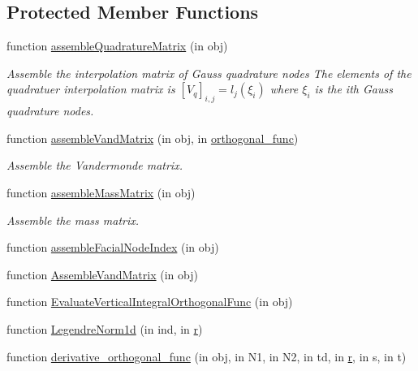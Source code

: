 \subsection*{Protected Member Functions}
\begin{DoxyCompactItemize}
\item 
function \hyperlink{class_std_prism_quad_a394370fb840f0276eeaf50183c2560e7}{assemble\+Quadrature\+Matrix} (in obj)
\begin{DoxyCompactList}\small\item\em Assemble the interpolation matrix of Gauss quadrature nodes The elements of the quadratuer interpolation matrix is $ [V_q]_{i,j} = l_j(\xi_i) $ where $ \xi_i $ is the ith Gauss quadrature nodes. \end{DoxyCompactList}\item 
function \hyperlink{class_std_prism_quad_a6414e5f23eaf75fbce9ad2fa9aad58e6}{assemble\+Vand\+Matrix} (in obj, in \hyperlink{class_std_prism_quad_aec55fc052d6e826ada2bddfe43926c87}{orthogonal\+\_\+func})
\begin{DoxyCompactList}\small\item\em Assemble the Vandermonde matrix. \end{DoxyCompactList}\item 
function \hyperlink{class_std_prism_quad_abdff64696376581e06591300e267a3b6}{assemble\+Mass\+Matrix} (in obj)
\begin{DoxyCompactList}\small\item\em Assemble the mass matrix. \end{DoxyCompactList}\item 
function \hyperlink{class_std_prism_quad_abc39ddfc5356879b6e69c502a9a4cda2}{assemble\+Facial\+Node\+Index} (in obj)
\item 
function \hyperlink{class_std_prism_quad_ab3bdce9fa6e934eb292875e960c1919e}{Assemble\+Vand\+Matrix} (in obj)
\item 
function \hyperlink{class_std_prism_quad_ad5f68cd18a07de6514e29083358d6351}{Evaluate\+Vertical\+Integral\+Orthogonal\+Func} (in obj)
\item 
function \hyperlink{class_std_prism_quad_a6d4c28af139e082d9efebfc88906351a}{Legendre\+Norm1d} (in ind, in \hyperlink{class_std_prism_quad_ab1bbbef07ec9f1a9f0727140c5c26f39}{r})
\item 
function \hyperlink{class_std_prism_quad_a163f8ef946f7b5b7bb3cdf9b1ef260f4}{derivative\+\_\+orthogonal\+\_\+func} (in obj, in N1, in N2, in td, in \hyperlink{class_std_prism_quad_ab1bbbef07ec9f1a9f0727140c5c26f39}{r}, in s, in t)

\end{DoxyCompactItemize}
